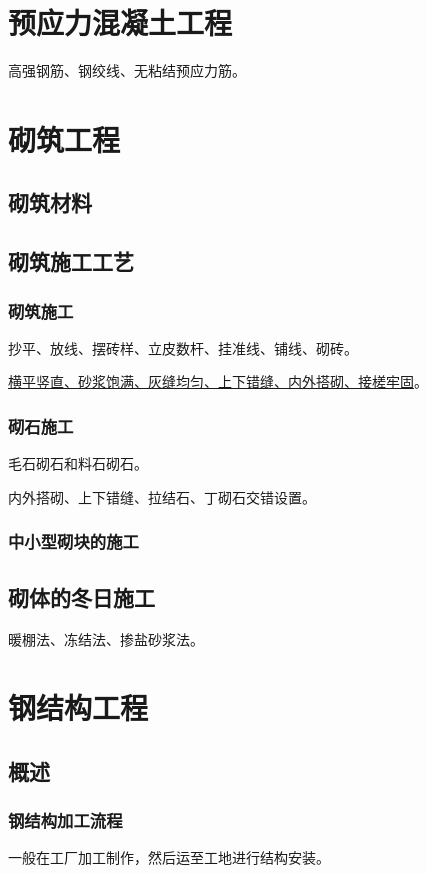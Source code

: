 \documentclass{book}
\begin{document}
\chapter{预应力混凝土工程}
\par 高强钢筋、钢绞线、无粘结预应力筋。
\chapter{砌筑工程}
\section{砌筑材料}
\section{砌筑施工工艺}
\subsection{砌筑施工}
\par 抄平、放线、摆砖样、立皮数杆、挂准线、铺线、砌砖。
\par \uline{横平竖直、砂浆饱满、灰缝均匀、上下错缝、内外搭砌、接槎牢固}。
\subsection{砌石施工}
\par 毛石砌石和料石砌石。
\par 内外搭砌、上下错缝、拉结石、丁砌石交错设置。
\subsection{中小型砌块的施工}
\section{砌体的冬日施工}
\par 暖棚法、冻结法、掺盐砂浆法。
\chapter{钢结构工程}
\section{概述}
\subsection{钢结构加工流程}
\par 一般在工厂加工制作，然后运至工地进行结构安装。
\end{document}
